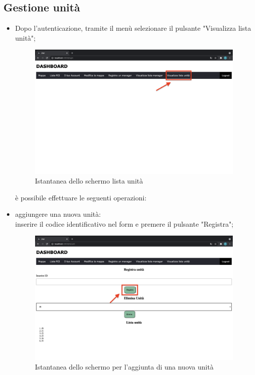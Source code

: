 \subsection{Gestione unità}
\begin{itemize}
\item Dopo l'autenticazione, tramite il menù selezionare il pulsante "Visualizza lista unità"; 
\begin{figure}[H]
    \centering
    \includegraphics[scale=0.12]{res/images/dashboard7.png}
    \caption{Istantanea dello schermo lista unità}
\end{figure}
è possibile effettuare le seguenti operazioni:
    \item aggiungere una nuova unità: \\inserire il codice identificativo nel form e premere il pulsante "Registra";
    \begin{figure}[H]
        \centering
        \includegraphics[scale=0.12]{res/images/nuovaunita.png}
        \caption{Istantanea dello schermo per l'aggiunta di una nuova unità}

\end{figure}
\end{itemize}
